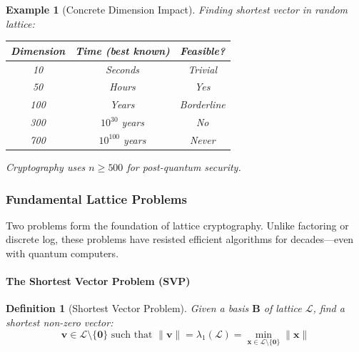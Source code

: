 \documentclass[11pt,a4paper]{article}
\newtheorem{definition}{Definition}
\newtheorem{example}{Example}
\begin{document}
\begin{example}[Concrete Dimension Impact]
Finding shortest vector in random lattice:
\begin{center}
\begin{tabular}{|c|c|c|}
\hline
\textbf{Dimension} & \textbf{Time (best known)} & \textbf{Feasible?} \\
\hline
10 & Seconds & Trivial \\
50 & Hours & Yes \\
100 & Years & Borderline \\
300 & $10^{30}$ years & No \\
700 & $10^{100}$ years & Never \\
\hline
\end{tabular}
\end{center}
Cryptography uses $n \geq 500$ for post-quantum security.
\end{example}

\subsubsection{Fundamental Lattice Problems}

Two problems form the foundation of lattice cryptography. Unlike factoring or discrete log, these problems have resisted efficient algorithms for decades—even with quantum computers.

\paragraph{The Shortest Vector Problem (SVP)}

\begin{definition}[Shortest Vector Problem]
Given a basis $\mathbf{B}$ of lattice $\mathcal{L}$, find a shortest non-zero vector:
$$\mathbf{v} \in \mathcal{L} \setminus \{\mathbf{0}\} \text{ such that } \|\mathbf{v}\| = \lambda_1(\mathcal{L}) = \min_{\mathbf{x} \in \mathcal{L} \setminus \{\mathbf{0}\}} \|\mathbf{x}\|$$
\end{definition}
\end{document}
